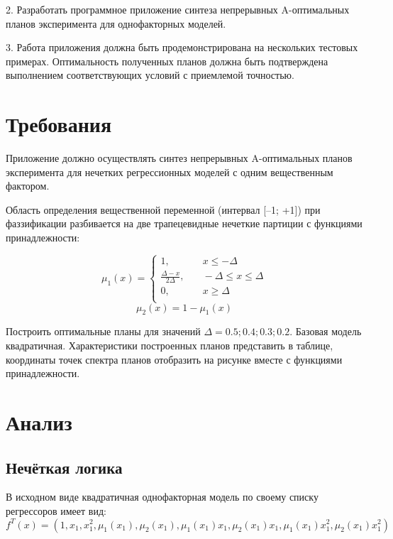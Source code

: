 2. Разработать программное приложение синтеза  непрерывных A-оптимальных планов
эксперимента для однофакторных моделей.

3. Работа приложения должна быть продемонстрирована на нескольких тестовых примерах.
Оптимальность полученных планов должна быть подтверждена выполнением соответствующих
условий с приемлемой точностью.



\section{Требования}

Приложение  должно  осуществлять  синтез непрерывных A-оптимальных планов 
эксперимента для нечетких регрессионных моделей с одним вещественным фактором.

Область  определения  вещественной  переменной (интервал  [–1; +1]) при фаззификации 
разбивается на две трапецевидные нечеткие партиции с функциями принадлежности:


\[
    \mu_1(x) = 
        \begin{cases}
            1,                          & \quad x \leq -\Delta \\
            \frac{\Delta-x}{2\Delta},   & \quad -\Delta \leq x \leq \Delta \\
            0,                          & \quad x \geq \Delta \\
        \end{cases}
\]
\[ \mu_2(x) = 1 - \mu_1(x) \]

Построить оптимальные планы для значений $\Delta = {0.5;0.4;0.3;0.2}$.
Базовая модель квадратичная. Характеристики построенных планов представить в таблице,
координаты точек спектра планов отобразить на рисунке вместе с функциями принадлежности.




\section{Анализ}
\subsection{Нечёткая логика}

В исходном виде квадратичная однофакторная модель по своему списку регрессоров имеет вид:
\[ f^T(x) = (1, x_1, x_1^2, \mu_1(x_1), \mu_2(x_1), \mu_1(x_1)x_1, \mu_2(x_1)x_1, \mu_1(x_1)x_1^2, \mu_2(x_1)x_1^2) \]


